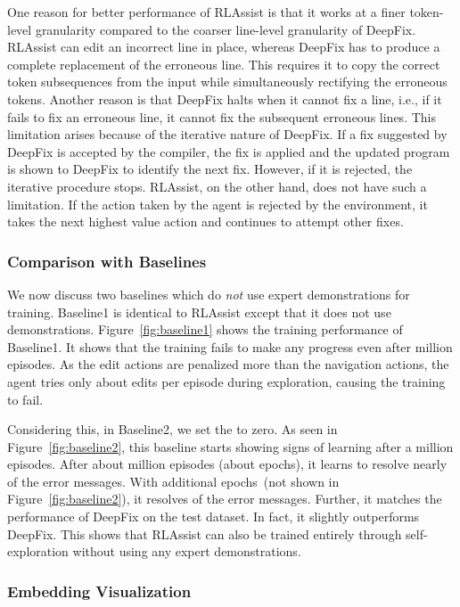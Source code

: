 \documentclass{article}
\begin{document}
One reason for better performance of RLAssist is that it works at a finer token-level granularity compared to the coarser line-level granularity of DeepFix.
RLAssist can edit an incorrect line in place, whereas DeepFix has to
produce a complete replacement of the erroneous line. This requires it to
copy the correct token subsequences from the input while simultaneously rectifying
the erroneous tokens.
Another reason is that DeepFix halts when it cannot fix a line, i.e., if it fails to fix an erroneous line, it cannot fix the subsequent erroneous lines.
This limitation arises because of the iterative nature of DeepFix.
If a fix suggested by DeepFix is accepted by the compiler, the fix is applied and the updated program is shown to
DeepFix to identify the next fix.
However, if it is rejected, the iterative procedure stops.
RLAssist, on the other hand, does not have such a limitation.
If the action taken by the agent is rejected by the environment, it takes the next highest value action and continues to attempt other fixes.

\subsubsection{Comparison with Baselines}

We now discuss two baselines which do \emph{not} use expert demonstrations for training.
Baseline1 is identical to RLAssist except that it does not use demonstrations.
Figure~\ref{fig:baseline1} shows the training performance of Baseline1. It shows that the training fails to make any progress even after  million episodes.
As the edit actions are penalized more than the navigation actions, the agent tries only about  edits per episode during exploration, causing the training to fail.

Considering this, in Baseline2, we set the  to zero.
As seen in Figure~\ref{fig:baseline2}, this baseline
starts showing signs of learning after a million episodes.
After about  million episodes (about  epochs), it learns to resolve nearly  of the error messages.
With additional  epochs~(not shown in Figure~\ref{fig:baseline2}), it resolves  of the error messages.
Further, it matches the performance of DeepFix on the test dataset.
In fact, it slightly outperforms DeepFix.
This shows that RLAssist can also be trained entirely through self-exploration without using any expert demonstrations.

\subsubsection{Embedding Visualization}
\end{document}
